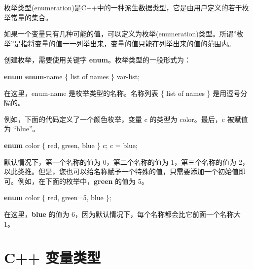 \documentclass[
]{article}
\newenvironment{Shaded}{}{}
\newcommand{\DecValTok}[1]{\textcolor[rgb]{0.25,0.63,0.44}{#1}}
\newcommand{\KeywordTok}[1]{\textcolor[rgb]{0.00,0.44,0.13}{\textbf{#1}}}
\newcommand{\NormalTok}[1]{#1}
\newcommand{\OperatorTok}[1]{\textcolor[rgb]{0.40,0.40,0.40}{#1}}
\begin{document}
枚举类型(enumeration)是C++中的一种派生数据类型，它是由用户定义的若干枚举常量的集合。

如果一个变量只有几种可能的值，可以定义为枚举(enumeration)类型。所谓''枚举''是指将变量的值一一列举出来，变量的值只能在列举出来的值的范围内。

创建枚举，需要使用关键字 \textbf{enum}。枚举类型的一般形式为：

\begin{Shaded}
\begin{Highlighting}[]
\KeywordTok{enum} \KeywordTok{enum}\OperatorTok{{-}}\NormalTok{name }\OperatorTok{\{}\NormalTok{ list of names }\OperatorTok{\}}\NormalTok{ var}\OperatorTok{{-}}\NormalTok{list}\OperatorTok{;}
\end{Highlighting}
\end{Shaded}

在这里，enum-name 是枚举类型的名称。名称列表 \{ list of names \}
是用逗号分隔的。

例如，下面的代码定义了一个颜色枚举，变量 c 的类型为 color。最后，c
被赋值为 ``blue''。

\begin{Shaded}
\begin{Highlighting}[]
\KeywordTok{enum}\NormalTok{ color }\OperatorTok{\{}\NormalTok{ red}\OperatorTok{,}\NormalTok{ green}\OperatorTok{,}\NormalTok{ blue }\OperatorTok{\}}\NormalTok{ c}\OperatorTok{;}
\NormalTok{c }\OperatorTok{=}\NormalTok{ blue}\OperatorTok{;}
\end{Highlighting}
\end{Shaded}

默认情况下，第一个名称的值为 0，第二个名称的值为 1，第三个名称的值为
2，以此类推。但是，您也可以给名称赋予一个特殊的值，只需要添加一个初始值即可。例如，在下面的枚举中，\textbf{green}
的值为 5。

\begin{Shaded}
\begin{Highlighting}[]
\KeywordTok{enum}\NormalTok{ color }\OperatorTok{\{}\NormalTok{ red}\OperatorTok{,}\NormalTok{ green}\OperatorTok{=}\DecValTok{5}\OperatorTok{,}\NormalTok{ blue }\OperatorTok{\};}
\end{Highlighting}
\end{Shaded}

在这里，\textbf{blue} 的值为
6，因为默认情况下，每个名称都会比它前面一个名称大 1。

\hypertarget{c-ux53d8ux91cfux7c7bux578b}{%
\section{C++ 变量类型}\label{c-ux53d8ux91cfux7c7bux578b}}
\end{document}

